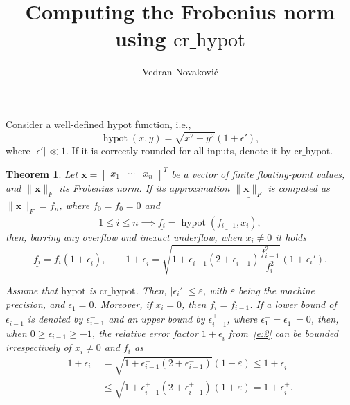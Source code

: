 \documentclass[a4paper,12pt,twoside]{article}
\title{Computing the Frobenius norm using $\mathrm{cr\_hypot}$}
\author{Vedran Novakovi\'{c}}
\newtheorem{thm}{Theorem}
\begin{document}
\maketitle

Consider a well-defined $\mathrm{hypot}$ function, i.e.,
\begin{displaymath}
  \mathop{\mathrm{hypot}}(x,y)=\sqrt{x^2+y^2}(1+\epsilon'),
\end{displaymath}
where $|\epsilon'|\ll 1$.  If it is correctly rounded for all inputs,
denote it by $\mathrm{cr\_hypot}$.

\begin{thm}\label{t:1}
  Let $\mathbf{x}=\begin{bmatrix}x_1&\cdots&x_n\end{bmatrix}^T$ be a
  vector of finite floating-point values, and $\|\mathbf{x}\|_F$ its
  Frobenius norm.  If its approximation $\underline{\|\mathbf{x}\|_F}$
  is computed as $\underline{\|\mathbf{x}\|_F}=\underline{f_n}$, where
  $\underline{f_0}=f_0=0$ and
  \begin{equation}
    1\le i\le n\implies\underline{f_i}=\mathop{\mathrm{hypot}}(\underline{f_{i-1}},x_i),
    \label{e:1}
  \end{equation}
  then, barring any overflow and inexact underflow, when $x_i\ne 0$ it
  holds
  \begin{equation}
    \underline{f_i^{}}=f_i^{}(1+\epsilon_i^{}),\qquad
    1+\epsilon_i^{}=\sqrt{1+\epsilon_{i-1}^{}(2+\epsilon_{i-1}^{})\frac{f_{i-1}^2}{f_i^2}}(1+\epsilon_i').
    \label{e:2}
  \end{equation}

  Assume that $\mathrm{hypot}$ is $\mathrm{cr\_hypot}$.  Then,
  $|\epsilon_i'|\le\varepsilon$, with $\varepsilon$ being the machine
  precision, and $\epsilon_1^{}=0$.  Moreover, if $x_i=0$, then
  $\underline{f_i}=\underline{f_{i-1}}$.  If a lower bound of
  $\epsilon_{i-1}^{}$ is denoted by $\epsilon_{i-1}^-$ and an upper
  bound by $\epsilon_{i-1}^+$, where $\epsilon_1^-=\epsilon_1^+=0$,
  then, when $0\ge\epsilon_{i-1}^-\ge-1$, the relative error factor
  $1+\epsilon_i^{}$ from~\eqref{e:2} can be bounded irrespectively of
  $x_i^{}\ne 0$ and $f_i^{}$ as
  \begin{equation}
    \begin{aligned}
      1+\epsilon_i^-&=\sqrt{1+\epsilon_{i-1}^-(2+\epsilon_{i-1}^-)}(1-\varepsilon)\le 1+\epsilon_i^{}\\
      &\le\sqrt{1+\epsilon_{i-1}^+(2+\epsilon_{i-1}^+)}(1+\varepsilon)=1+\epsilon_i^+.
    \end{aligned}
    \label{e:3}
  \end{equation}
\end{thm}
\end{document}
